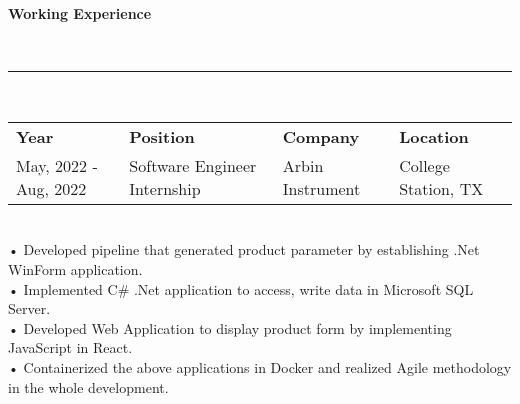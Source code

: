 \documentclass[a4paper,10pt]{article}
\newcommand{\resheading}[1]{{\small \colorbox{mygrey}{\begin{minipage}{0.975\textwidth}{\textbf{#1 \vphantom{p\^{E}}}}\end{minipage}}}}
\begin{document}
\resheading{\textbf{Working Experience} }\\
\indent \rule{6.88in}{0.4pt}\\
\indent \begin{tabular}{ l @{\hskip 0.15in} l @{\hskip 1.1in} l @{\hskip 0.15in} l @{\hskip 0.15in} }
\noindent \textbf{Year} & \textbf{Position} & \textbf{Company} & \textbf{Location}\\
May, 2022 - Aug, 2022 & Software Engineer Internship   
 & Arbin Instrument & College Station, TX
\end{tabular}
\\

\indent• Developed pipeline that generated product parameter by establishing .Net WinForm application.\\
\indent• Implemented C\# .Net application to access, write data in Microsoft SQL Server.\\
\indent• Developed Web Application to display product form by implementing JavaScript in React.\\
\indent• Containerized the above applications in Docker and realized Agile methodology in the whole development.\\
 
\end{document}
